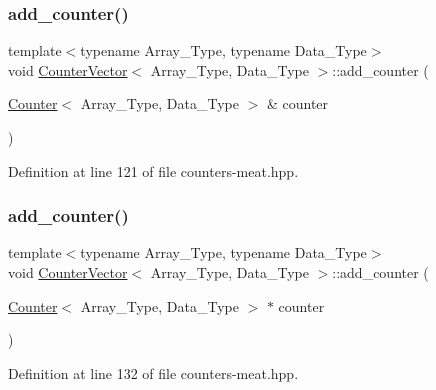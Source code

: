 \subsubsection{\texorpdfstring{add\+\_\+counter()}{add\_counter()}\hspace{0.1cm}{\footnotesize\ttfamily [1/3]}}
{\footnotesize\ttfamily template$<$typename Array\+\_\+\+Type, typename Data\+\_\+\+Type$>$ \\
void \hyperlink{class_counter_vector}{Counter\+Vector}$<$ Array\+\_\+\+Type, Data\+\_\+\+Type $>$\+::add\+\_\+counter (\begin{DoxyParamCaption}\item[{\hyperlink{class_counter}{Counter}$<$ Array\+\_\+\+Type, Data\+\_\+\+Type $>$ \&}]{counter }\end{DoxyParamCaption})\hspace{0.3cm}{\ttfamily [inline]}}



Definition at line 121 of file counters-\/meat.\+hpp.

\mbox{\label{class_counter_vector_a062d52e18f1d3ba4c00cbf4c2d89f1e7}} 
\subsubsection{\texorpdfstring{add\+\_\+counter()}{add\_counter()}\hspace{0.1cm}{\footnotesize\ttfamily [2/3]}}
{\footnotesize\ttfamily template$<$typename Array\+\_\+\+Type, typename Data\+\_\+\+Type$>$ \\
void \hyperlink{class_counter_vector}{Counter\+Vector}$<$ Array\+\_\+\+Type, Data\+\_\+\+Type $>$\+::add\+\_\+counter (\begin{DoxyParamCaption}\item[{\hyperlink{class_counter}{Counter}$<$ Array\+\_\+\+Type, Data\+\_\+\+Type $>$ $\ast$}]{counter }\end{DoxyParamCaption})\hspace{0.3cm}{\ttfamily [inline]}}



Definition at line 132 of file counters-\/meat.\+hpp.

\mbox{\label{class_counter_vector_adb32ff1af45bc05a292a5cb064dc414d}} 
